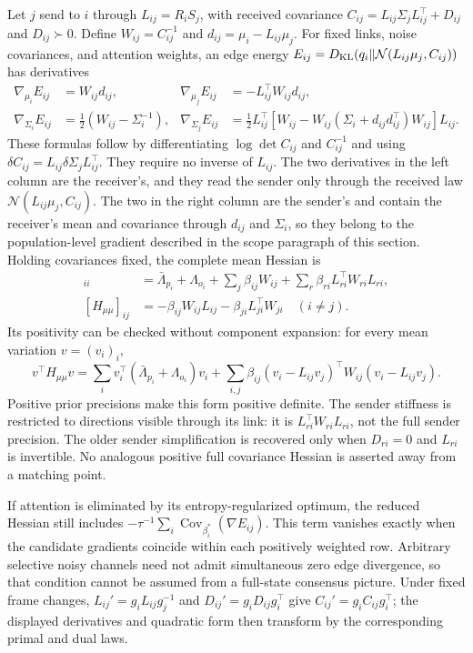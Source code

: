 Let $j$ send to $i$ through $L_{ij}=R_iS_j$, with received covariance
$C_{ij}=L_{ij}\Sigma_jL_{ij}^\top+D_{ij}$ and $D_{ij}\succ0$.
Define $W_{ij}=C_{ij}^{-1}$ and $d_{ij}=\mu_i-L_{ij}\mu_j$.
For fixed links, noise covariances, and attention weights, an edge energy
$E_{ij}=D_{\rm KL}(q_i\|\mathcal N(L_{ij}\mu_j,C_{ij}))$ has derivatives
\begin{align}
 \nabla_{\mu_i}E_{ij}&=W_{ij}d_{ij},&
 \nabla_{\mu_j}E_{ij}&=-L_{ij}^\top W_{ij}d_{ij},\\
 \nabla_{\Sigma_i}E_{ij}&=\tfrac12(W_{ij}-\Sigma_i^{-1}),&
 \nabla_{\Sigma_j}E_{ij}&=\tfrac12L_{ij}^\top
 [W_{ij}-W_{ij}(\Sigma_i+d_{ij}d_{ij}^\top)W_{ij}]L_{ij}.
 \label{eq:selective_stiffness_derivatives}
\end{align}
These formulas follow by differentiating $\log\det C_{ij}$ and
$C_{ij}^{-1}$ and using $\delta C_{ij}=L_{ij}\delta\Sigma_jL_{ij}^\top$.
They require no inverse of $L_{ij}$. The two derivatives in the left column are the receiver's, and they read the sender only through the received law $\mathcal N(L_{ij}\mu_j,C_{ij})$. The two in the right column are the sender's and contain the receiver's mean and covariance through $d_{ij}$ and $\Sigma_i$, so they belong to the population-level gradient described in the scope paragraph of this section. Holding covariances fixed, the complete mean Hessian is
\begin{align}
 [H_{\mu\mu}]_{ii}&=\bar\Lambda_{p_i}+\Lambda_{o_i}
 +\sum_j\beta_{ij}W_{ij}
 +\sum_r\beta_{ri}L_{ri}^\top W_{ri}L_{ri},\\
 [H_{\mu\mu}]_{ij}&=-\beta_{ij}W_{ij}L_{ij}
 -\beta_{ji}L_{ji}^\top W_{ji}\quad(i\ne j).
 \label{eq:selective_stiffness_blocks}
\end{align}
Its positivity can be checked without component expansion: for every mean variation $v=(v_i)_i$,
\begin{equation}
 v^\top H_{\mu\mu}v
 =\sum_i v_i^\top(\bar\Lambda_{p_i}+\Lambda_{o_i})v_i
 +\sum_{i,j}\beta_{ij}(v_i-L_{ij}v_j)^\top W_{ij}(v_i-L_{ij}v_j).
 \label{eq:selective_stiffness_positive}
\end{equation}
Positive prior precisions make this form positive definite. The sender stiffness is restricted to directions visible through its link: it is $L_{ri}^\top W_{ri}L_{ri}$, not the full sender precision. The older sender simplification is recovered only when $D_{ri}=0$ and $L_{ri}$ is invertible. No analogous positive full covariance Hessian is asserted away from a matching point.

If attention is eliminated by its entropy-regularized optimum, the reduced Hessian still includes
$-\tau^{-1}\sum_i\operatorname{Cov}_{\beta_i^*}(\nabla E_{ij})$.
This term vanishes exactly when the candidate gradients coincide within each positively weighted row. Arbitrary selective noisy channels need not admit simultaneous zero edge divergence, so that condition cannot be assumed from a full-state consensus picture. Under fixed frame changes, $L_{ij}'=g_iL_{ij}g_j^{-1}$ and $D_{ij}'=g_iD_{ij}g_i^\top$ give $C_{ij}'=g_iC_{ij}g_i^\top$; the displayed derivatives and quadratic form then transform by the corresponding primal and dual laws.

